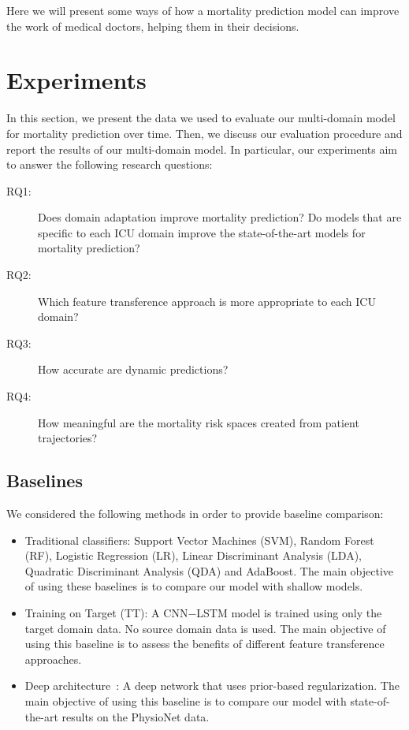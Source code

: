 Here we will present some ways of how a mortality prediction model can improve the work of medical doctors, helping them in their decisions.


\section{Experiments}

In this section, we present the data we used to evaluate our multi-domain model for mortality prediction over time. Then, we discuss our evaluation procedure and report the results of our multi-domain model. In particular, our experiments aim to answer the following research questions:

\begin{description}
\item [RQ1:] Does domain adaptation improve mortality prediction? Do models that are specific to each ICU domain improve the state-of-the-art models for mortality prediction?
\item [RQ2:] Which feature transference approach is more appropriate to each ICU domain?
\item [RQ3:] How accurate are dynamic predictions?
\item [RQ4:] How meaningful are the mortality risk spaces created from patient trajectories?
\end{description}

\subsection{Baselines}

We considered the following methods in order to provide baseline comparison:

\begin{itemize}
\item Traditional classifiers: Support Vector Machines (SVM), Random Forest (RF), Logistic Regression (LR), Linear Discriminant Analysis (LDA), Quadratic Discriminant Analysis (QDA) and AdaBoost. The main objective of using these baselines is to compare our model with shallow models.
\item Training on Target (TT): A CNN$-$LSTM model is trained using only the target domain data. No source domain data is used. The main objective of using this baseline is to assess the benefits of different feature transference approaches.
\item Deep architecture~\citep{kdd}: A deep network that uses prior-based regularization. The main objective of using this baseline is to compare our model with state-of-the-art results on the PhysioNet data.
\end{itemize}


